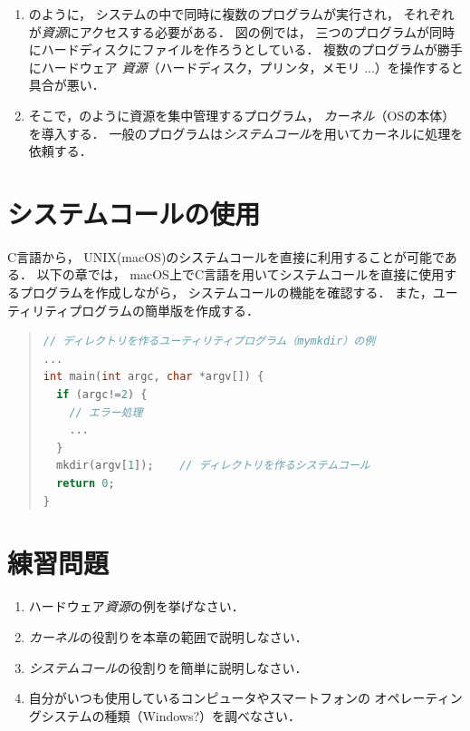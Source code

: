 \begin{enumerate}
\item {}のように，
システムの中で同時に複数のプログラムが実行され，
それぞれが\emph{資源}にアクセスする必要がある．
図の例では，
三つのプログラムが同時にハードディスクにファイルを作ろうとしている．
複数のプログラムが勝手にハードウェア
\emph{資源}（ハードディスク，プリンタ，メモリ ...）を操作すると具合が悪い．
\item そこで，のように資源を集中管理するプログラム，
\emph{カーネル}（OSの本体）を導入する．
一般のプログラムは\emph{システムコール}を用いてカーネルに処理を依頼する．
\end{enumerate}

\section{システムコールの使用}
C言語から，
UNIX(macOS)のシステムコールを直接に利用することが可能である．
以下の章では，
macOS上でC言語を用いてシステムコールを直接に使用するプログラムを作成しながら，
システムコールの機能を確認する．
また，ユーティリティプログラムの簡単版を作成する．

\begin{quote}
\begin{lstlisting}[language=C++, numbers=none]
// ディレクトリを作るユーティリティプログラム（mymkdir）の例
...
int main(int argc, char *argv[]) {
  if (argc!=2) {
    // エラー処理
    ...
  }
  mkdir(argv[1]);    // ディレクトリを作るシステムコール
  return 0;
}
\end{lstlisting}
\end{quote}

\section*{練習問題}
\begin{enumerate}

\item ハードウェア\emph{資源}の例を挙げなさい．

\item \emph{カーネル}の役割りを本章の範囲で説明しなさい．

\item \emph{システムコール}の役割りを簡単に説明しなさい．

\item 自分がいつも使用しているコンピュータやスマートフォンの
オペレーティングシステムの種類（Windows?）を調べなさい．
\end{enumerate}

